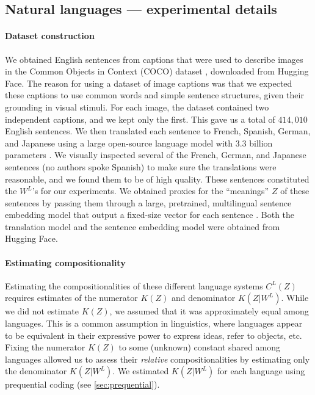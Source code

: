 \documentclass{article} %
\begin{document}
\begin{appendices}
\section{Natural languages --- experimental details}
\label{sec:natural_details}

\paragraph{Dataset construction}

We obtained English sentences from captions that were used to describe images in the Common Objects in Context (COCO) dataset \citep{coco-captions}, downloaded from Hugging Face. The reason for using a dataset of image captions was that we expected these captions to use common words and simple sentence structures, given their grounding in visual stimuli. For each image, the dataset contained two independent captions, and we kept only the first. This gave us a total of $414,010$ English sentences. We then translated each sentence to French, Spanish, German, and Japanese using a large open-source language model with 3.3 billion parameters \citep{costa2022no}. We visually inspected several of the French, German, and Japanese sentences (no authors spoke Spanish) to make sure the translations were reasonable, and we found them to be of high quality. These sentences constituted the $W^L$'s for our experiments. We obtained proxies for the ``meanings'' $Z$ of these sentences by passing them through a large, pretrained, multilingual sentence embedding model that output a fixed-size vector for each sentence \citep{reimers-2020-multilingual-sentence-bert}. Both the translation model and the sentence embedding model were obtained from Hugging Face.

\paragraph{Estimating compositionality}

Estimating the compositionalities of these different language systems $C^L(Z)$ requires estimates of the numerator $K(Z)$ and denominator $K(Z|W^L)$. While we did not estimate $K(Z)$, we assumed that it was approximately equal among languages. This is a common assumption in linguistics, where languages appear to be equivalent in their expressive power to express ideas, refer to objects, etc. Fixing the numerator $K(Z)$ to some (unknown) constant shared among languages allowed us to assess their \emph{relative} compositionalities by estimating only the denominator $K(Z|W^L)$. We estimated $K(Z|W^L)$ for each language using prequential coding (see \cref{sec:prequential}).


\end{appendices}
\end{document}
